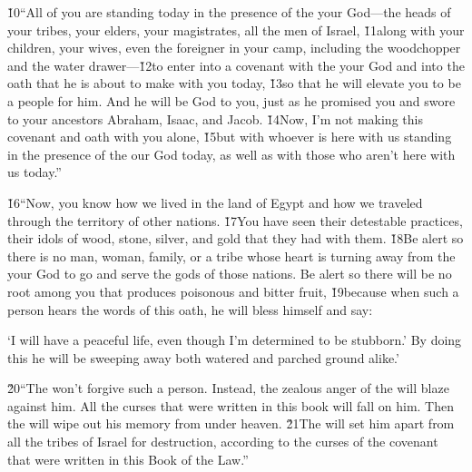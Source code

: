 \v{10}``All of you are standing today in the presence of the  your God---the heads of your tribes, your elders, your magistrates, all the men of Israel, \v{11}along with your children, your wives, even the foreigner in your camp, including the woodchopper and the water drawer---\v{12}to enter into a covenant with the  your God and into the oath that he is about to make with you today, \v{13}so that he will elevate you to be a people for him. And he will be God to you, just as he promised you and swore to your ancestors Abraham, Isaac, and Jacob. \v{14}Now, I'm not making this covenant and oath with you alone, \v{15}but with whoever is here with us standing in the presence of the  our God today, as well as with those who aren't here with us today.''

\v{16}``Now, you know how we lived in the land of Egypt and how we traveled through the territory of other nations. \v{17}You have seen their detestable practices, their idols of wood, stone, silver, and gold that they had with them. \v{18}Be alert so there is no man, woman, family, or a tribe whose heart is turning away from the  your God to go and serve the gods of those nations. Be alert so there will be no root among you that produces poisonous and bitter fruit, \v{19}because when such a person hears the words of this oath, he will bless himself and say:

\begin{poetry}
\poeml `I will have a peaceful life, even though I'm determined to be stubborn.' By doing this he will be sweeping away both watered and parched ground alike.'
\end{poetry}

\v{20}``The  won't forgive such a person. Instead, the zealous anger of the  will blaze against him. All the curses that were written in this book will fall on him. Then the  will wipe out his memory from under heaven. \v{21}The  will set him apart from all the tribes of Israel for destruction, according to the curses of the covenant that were written in this Book of the Law.''

